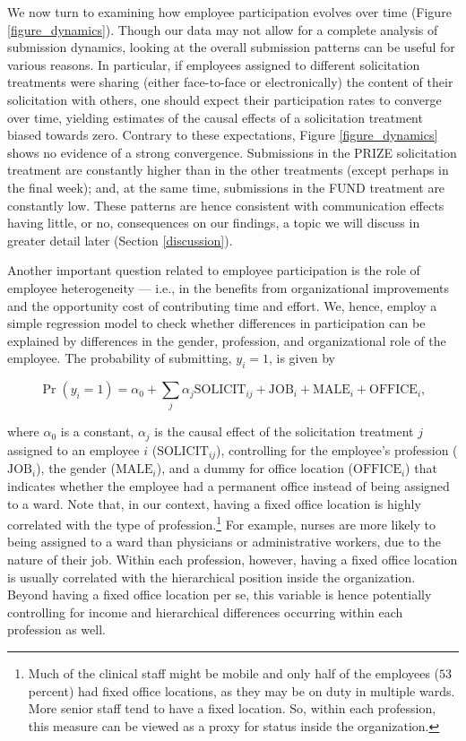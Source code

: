 \documentclass[12pt, titlepage]{article}
\begin{document}
We now turn to examining how employee participation evolves over time
(Figure \ref{figure_dynamics}). Though our data may not allow for a
complete analysis of submission dynamics, looking at the overall
submission patterns can be useful for various reasons. In particular, if
employees assigned to different solicitation treatments were sharing
(either face-to-face or electronically) the content of their
solicitation with others, one should expect their participation rates to
converge over time, yielding estimates of the causal effects of a
solicitation treatment biased towards zero. Contrary to these
expectations, Figure \ref{figure_dynamics} shows no evidence of a strong
convergence. Submissions in the PRIZE solicitation treatment are
constantly higher than in the other treatments (except perhaps in the
final week); and, at the same time, submissions in the FUND treatment
are constantly low. These patterns are hence consistent with
communication effects having little, or no, consequences on our
findings, a topic we will discuss in greater detail later (Section
\ref{discussion}).

Another important question related to employee participation is the role
of employee heterogeneity --- i.e., in the benefits from organizational
improvements and the opportunity cost of contributing time and effort.
We, hence, employ a simple regression model to check whether differences
in participation can be explained by differences in the gender,
profession, and organizational role of the employee. The probability of
submitting, \(y_i=1\), is given by

\begin{equation} 
  \label{eq: submit}
    \Pr(y_i=1) = \alpha_0 + \sum_{j} \alpha_{j} \text{SOLICIT}_{ij}
                                    + \text{JOB}_{i} 
                                    + \text{MALE}_{i} 
                                    + \text{OFFICE}_{i}, 
\end{equation}

where \(\alpha_0\) is a constant, \(\alpha_j\) is the causal effect of
the solicitation treatment \(j\) assigned to an employee \(i\)
(\(\text{SOLICIT}_{ij}\)), controlling for the employee's profession
(\(\text{JOB}_i\)), the gender (\(\text{MALE}_i\)), and a dummy for
office location (\(\text{OFFICE}_i\)) that indicates whether the
employee had a permanent office instead of being assigned to a ward.
Note that, in our context, having a fixed office location is highly
correlated with the type of profession.\footnote{Much of the clinical
  staff might be mobile and only half of the employees (\(53\) percent)
  had fixed office locations, as they may be on duty in multiple wards.
  More senior staff tend to have a fixed location. So, within each
  profession, this measure can be viewed as a proxy for status inside
  the organization.} For example, nurses are more likely to being
assigned to a ward than physicians or administrative workers, due to the
nature of their job. Within each profession, however, having a fixed
office location is usually correlated with the hierarchical position
inside the organization. Beyond having a fixed office location per se,
this variable is hence potentially controlling for income and
hierarchical differences occurring within each profession as well.
\end{document}
